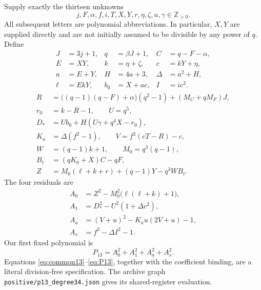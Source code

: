 \documentclass[11pt,a4paper]{article}
\theoremstyle{definition}
\theoremstyle{remark}
\newcommand{\Zpos}{\mathbb Z_{>0}}
\newcommand{\sourcepath}[1]{\texttt{\small #1}}
\begin{document}
Supply exactly the thirteen unknowns
\begin{equation}
 j,F,\alpha,f,i,T,X,Y,r,\eta,\zeta,u,\gamma\in\Zpos.
                                                        \label{eq:vars13}
\end{equation}
All subsequent letters are polynomial abbreviations. In particular,
\(X,Y\) are supplied directly and are not initially assumed to be
divisible by any power of \(q\). Define
\begin{align}
 J&=3j+1,& q&=\beta J+1,& C&=q-F-\alpha, \nonumber\\
 E&=XY,& k&=\eta+\zeta,& c&=kY+\eta, \nonumber\\
 a&=E+Y,& H&=4a+3,& \Delta&=a^2+H, \nonumber\\
 \ell&=EkY,& b_0&=X+ac,& I&=ic^2.             \label{eq:common13}
\end{align}
\begin{align}
 R&=\bigl((q-1)(q-F)+\alpha\bigr)(q^2-1)
                             +(M_C+qM_F)J, \nonumber\\
 r_0&=k-R-1,\qquad U=q^5, \nonumber\\
 D_*&=Ub_0+H(U\gamma+q^4X-r_0),              \label{eq:maincarrier}\\
 K_a&=\Delta(f^2-1),\qquad V=f^2(cT-R)-c,     \label{eq:aux13}\\
 W&=(q-1)k+1,\qquad M_0=q^3(q-1), \nonumber\\
 B_t&=(qK_0+X)C-qF, \nonumber\\
 Z&=M_0(\ell+k+r)+(q-1)Y-q^3WB_t.            \label{eq:firstcarrier}
\end{align}
The four residuals are
\begin{align}
 A_0&=Z^2-M_0^2\bigl(\ell(\ell+k)+1\bigr),     \label{eq:A0}\\
 A_1&=D_*^2-U^2(1+\Delta c^2),               \label{eq:A1}\\
 A_a&=(V+u)^2-K_a u(2V+u)-1,                 \label{eq:Aa}\\
 A_s&=f^2-\Delta I^2-1.                       \label{eq:As}
\end{align}
Our first fixed polynomial is
\begin{equation}
 \boxed{P_{13}=A_0^2+A_1^2+A_a^2+A_s^2.}     \label{eq:P13}
\end{equation}
Equations \eqref{eq:common13}--\eqref{eq:P13}, together with the coefficient
binding, are a literal division-free specification. The archive graph
\sourcepath{positive/p13\_degree34.json} gives its shared-register
evaluation.
\end{document}
